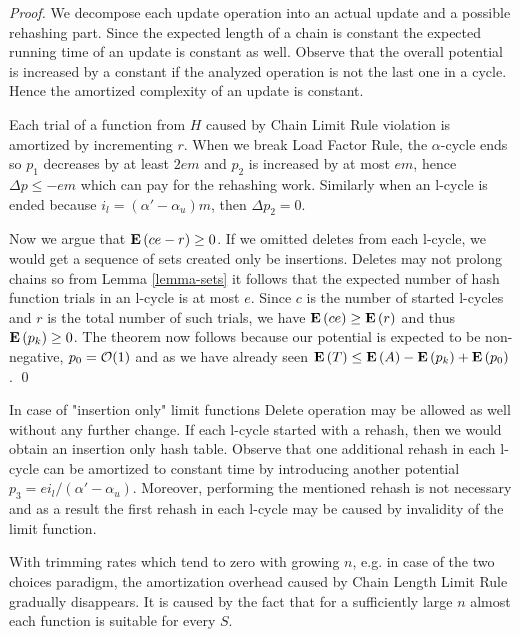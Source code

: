 \begin{proof}
We decompose each update operation into an actual update and a possible rehashing part. Since the expected length of a chain is constant the expected running time of an update is constant as well. Observe that the overall potential is increased by a constant if the analyzed operation is not the last one in a cycle. Hence the amortized complexity of an update is constant. 

Each trial of a function from $H$ caused by Chain Limit Rule violation is amortized by incrementing $r$. When we break Load Factor Rule, the $\alpha$-cycle ends so $p_1$ decreases by at least $2em$ and $p_2$ is increased by at most $em$, hence $\Delta p \leq -em$ which can pay for the rehashing work. Similarly when an l-cycle is ended because $i_l = (\alpha' - \alpha_u)m$, then $\Delta p_2 = 0$. 

Now we argue that $\mathbf{E}\left(ce - r\right) \geq 0$. If we omitted deletes from each l-cycle, we would get a sequence of sets created only be insertions. Deletes may not prolong chains so from Lemma \ref{lemma-sets} it follows that the expected number of hash function trials in an l-cycle is at most $e$. Since $c$ is the number of started l-cycles and $r$ is the total number of such trials, we have $\mathbf{E}\left(ce\right) \geq \mathbf{E}\left(r\right)$ and thus $\mathbf{E}\left(p_k\right) \geq 0$. The theorem now follows because our potential is expected to be non-negative, $p_0 = \mathcal{O}(1)$ and as we have already seen $\mathbf{E}\left(T\right) \leq \mathbf{E}\left(A\right) - \mathbf{E}\left(p_k\right) + \mathbf{E}\left(p_0\right)$.
\qed
\end{proof}

In case of "insertion only" limit functions Delete operation may be allowed as well without any further change. If each l-cycle started with a rehash, then we would obtain an insertion only hash table. Observe that one additional rehash in each l-cycle can be amortized to constant time by introducing another potential $p_3 = {ei_{l}}/{(\alpha' - \alpha_u)}$. Moreover, performing the mentioned rehash is not necessary and as a result the first rehash in each l-cycle may be caused by invalidity of the limit function.

With trimming rates which tend to zero with growing $n$, e.g. in case of the two choices paradigm, the amortization overhead caused by Chain Length Limit Rule gradually disappears. It is caused by the fact that for a sufficiently large $n$ almost each function is suitable for every $S$.
